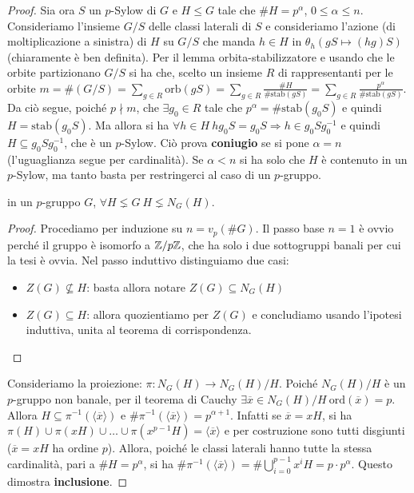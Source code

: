 \begin{proof}
    Sia ora $S$ un $p$-Sylow di $G$ e $H \leq G$ tale che $\#H = p^{\alpha}$, $0 \leq \alpha \leq n$. Consideriamo l'insieme $G/S$ delle classi laterali di $S$ e consideriamo l'azione (di moltiplicazione a sinistra) di $H$ su $G/S$ che manda $h \in H$ in $\theta_h(gS \mapsto (hg)S)$ (chiaramente è ben definita). Per il lemma orbita-stabilizzatore e usando che le orbite partizionano $G/S$ si ha che, scelto un insieme $R$ di rappresentanti per le orbite $m = \#(G/S) = \sum_{g \in R} \text{orb}(gS) = \sum_{g\in R} \frac{\#H}{\#\text{stab}(gS)} = \sum_{g\in R} \frac{p^{\alpha}}{\#\text{stab}(gS)}$. Da ciò segue, poiché $p \nmid m$, che $\exists g_0 \in R$ tale che $p^{\alpha} = \#\text{stab}(g_0S)$ e quindi $H = \text{stab}(g_0S)$. Ma allora si ha $\forall h \in H \ hg_0S = g_0S \Rightarrow h \in g_0 S g_0^{-1}$ e quindi $H \subseteq g_0Sg_0^{-1}$, che è un $p$-Sylow. Ciò prova \textbf{coniugio} se si pone $\alpha = n$ (l'uguaglianza segue per cardinalità).
    Se $\alpha < n$ si ha solo che $H$ è contenuto in un $p$-Sylow, ma tanto basta per restringerci al caso di un $p$-gruppo.
    \begin{lemma2}
        in un $p$-gruppo $G$, $\forall H \lneq G \ H \lneq N_G(H)$.
    \end{lemma2}
    \begin{proof}
        Procediamo per induzione su $n= v_p(\#G)$. Il passo base $n = 1$ è ovvio perché il gruppo è isomorfo a $\mathbb{Z}/p\mathbb{Z}$, che ha solo i due sottogruppi banali per cui la tesi è ovvia. Nel passo induttivo distinguiamo due casi: 
        \begin{itemize}
        \item $Z(G) \nsubseteq H$: basta allora notare  $Z(G) \subseteq N_G(H)$
        \item $Z(G) \subseteq H$: allora quozientiamo per $Z(G)$ e concludiamo usando l'ipotesi induttiva, unita al teorema di corrispondenza. 
        \end{itemize}
    \end{proof}
    Consideriamo la proiezione: $\pi: N_G(H) \rightarrow N_G(H)/H$. Poiché $N_G(H)/H$ è un $p$-gruppo non banale, per il teorema di Cauchy $\exists \overline x \in N_G(H)/H \ \text{ord}(\overline x) = p$. Allora $H \subseteq \pi^{-1}(\langle \overline x \rangle)$ e $\#\pi^{-1}(\langle \overline x \rangle) = p^{\alpha+1}$. Infatti se $\overline x = xH$, si ha $\pi(H)\cup \pi(xH)\cup\dots\cup\pi(x^{p-1}H) =  \langle \overline x \rangle$ e per costruzione sono tutti disgiunti ($\overline x = xH$ ha ordine $p$). Allora, poiché le classi laterali hanno tutte la stessa cardinalità, pari a $\#H = p^{\alpha}$, si ha $\#\pi^{-1}(\langle \overline x \rangle) = \#\bigcup_{i=0}^{p-1} x^iH = p\cdot p^{\alpha}$. Questo dimostra \textbf{inclusione}.
    

\end{proof}

